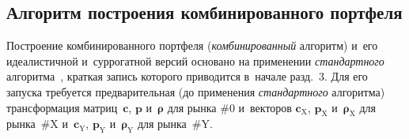 \begin{multicols}{2}
  \section{Алгоритм построения комбинированного портфеля}
   
  Построение комбинированного портфеля (\textit{комбинированный} 
алгоритм) и~его идеалистичной и~суррогатной версий основано на применении 
\textit{стандартного} алгоритма~\cite{2-ags, 3-ags, 4-ags, 5-ags}, краткая запись 
которого приводится в~начале разд.~3. Для его запуска требуется 
предварительная (до применения \textit{стандартного} алгоритма) 
трансформация мат\-риц~$\boldsymbol{c}$, $\boldsymbol{p}$ 
и~$\boldsymbol{\rho}$ для рынка \#0 и~векторов $\boldsymbol{c}_{\mathrm{X}}$, 
$\boldsymbol{p}_{\mathrm{X}}$ и~$\boldsymbol{\rho}_{\mathrm{X}}$ для 
рынка~\#X и~$\boldsymbol{c}_{\mathrm{Y}}$, $\boldsymbol{p}_{\mathrm{Y}}$ 
и~$\boldsymbol{\rho}_{\mathrm{Y}}$ для рынка~\#Y. 
  

\end{multicols}
